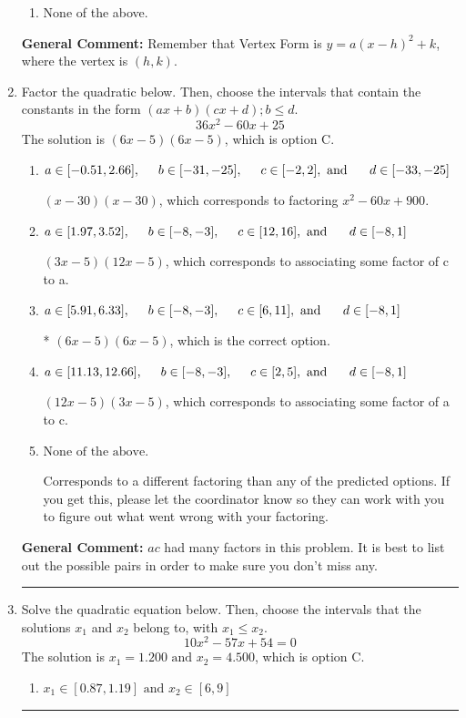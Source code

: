 \documentclass{extbook}[14pt]
\newcommand{\litem}[1]{\item #1

\rule{\textwidth}{0.4pt}}
\begin{document}
\begin{enumerate}
{\begin{enumerate}[label=\Alph*.]
\begin{multicols}{2}
\end{multicols}\item None of the above.\end{enumerate}
\textbf{General Comment:} Remember that Vertex Form is $y = a(x-h)^2+k$, where the vertex is $(h, k)$.
}
\litem{
Factor the quadratic below. Then, choose the intervals that contain the constants in the form $(ax+b)(cx+d); b \leq d.$
\[ 36x^{2} -60 x + 25 \]The solution is \( (6x -5)(6x -5) \), which is option C.\begin{enumerate}[label=\Alph*.]
\item \( a \in [-0.51, 2.66], \hspace*{5mm} b \in [-31, -25], \hspace*{5mm} c \in [-2, 2], \text{ and } \hspace*{5mm} d \in [-33, -25] \)

 $(x -30)(x -30)$, which corresponds to factoring $x^{2} -60 x + 900$.
\item \( a \in [1.97, 3.52], \hspace*{5mm} b \in [-8, -3], \hspace*{5mm} c \in [12, 16], \text{ and } \hspace*{5mm} d \in [-8, 1] \)

 $(3x -5)(12x -5)$, which corresponds to associating some factor of c to a.
\item \( a \in [5.91, 6.33], \hspace*{5mm} b \in [-8, -3], \hspace*{5mm} c \in [6, 11], \text{ and } \hspace*{5mm} d \in [-8, 1] \)

* $(6x -5)(6x -5)$, which is the correct option.
\item \( a \in [11.13, 12.66], \hspace*{5mm} b \in [-8, -3], \hspace*{5mm} c \in [2, 5], \text{ and } \hspace*{5mm} d \in [-8, 1] \)

 $(12x -5)(3x -5)$, which corresponds to associating some factor of a to c.
\item \( \text{None of the above.} \)

 Corresponds to a different factoring than any of the predicted options. If you get this, please let the coordinator know so they can work with you to figure out what went wrong with your factoring.
\end{enumerate}

\textbf{General Comment:} $ac$ had many factors in this problem. It is best to list out the possible pairs in order to make sure you don't miss any.
}
\litem{
Solve the quadratic equation below. Then, choose the intervals that the solutions $x_1$ and $x_2$ belong to, with $x_1 \leq x_2$.
\[ 10x^{2} -57 x + 54 = 0 \]The solution is \( x_1 = 1.200 \text{ and } x_2 = 4.500 \), which is option C.\begin{enumerate}[label=\Alph*.]
\item \( x_1 \in [0.87, 1.19] \text{ and } x_2 \in [6, 9] \)


\end{enumerate}}
\end{enumerate}
\end{document}

